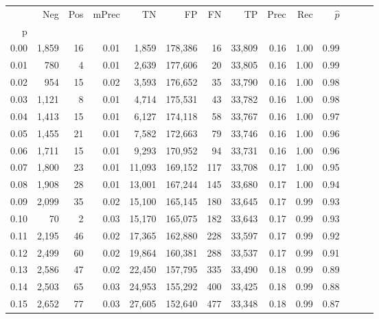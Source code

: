 \begin{tabular}{rrrrrrrrrrrrrr}
\toprule
{} &    Neg &  Pos & mPrec &       TN &       FP &      FN &      TP &  Prec &   Rec & $\hat{p}$ \\
p    &        &      &       &          &          &         &         &       &       &           \\
\midrule
0.00 &  1,859 &   16 &  0.01 &    1,859 &  178,386 &      16 &  33,809 &  0.16 &  1.00 &      0.99 \\
0.01 &    780 &    4 &  0.01 &    2,639 &  177,606 &      20 &  33,805 &  0.16 &  1.00 &      0.99 \\
0.02 &    954 &   15 &  0.02 &    3,593 &  176,652 &      35 &  33,790 &  0.16 &  1.00 &      0.98 \\
0.03 &  1,121 &    8 &  0.01 &    4,714 &  175,531 &      43 &  33,782 &  0.16 &  1.00 &      0.98 \\
0.04 &  1,413 &   15 &  0.01 &    6,127 &  174,118 &      58 &  33,767 &  0.16 &  1.00 &      0.97 \\
0.05 &  1,455 &   21 &  0.01 &    7,582 &  172,663 &      79 &  33,746 &  0.16 &  1.00 &      0.96 \\
0.06 &  1,711 &   15 &  0.01 &    9,293 &  170,952 &      94 &  33,731 &  0.16 &  1.00 &      0.96 \\
0.07 &  1,800 &   23 &  0.01 &   11,093 &  169,152 &     117 &  33,708 &  0.17 &  1.00 &      0.95 \\
0.08 &  1,908 &   28 &  0.01 &   13,001 &  167,244 &     145 &  33,680 &  0.17 &  1.00 &      0.94 \\
0.09 &  2,099 &   35 &  0.02 &   15,100 &  165,145 &     180 &  33,645 &  0.17 &  0.99 &      0.93 \\
0.10 &     70 &    2 &  0.03 &   15,170 &  165,075 &     182 &  33,643 &  0.17 &  0.99 &      0.93 \\
0.11 &  2,195 &   46 &  0.02 &   17,365 &  162,880 &     228 &  33,597 &  0.17 &  0.99 &      0.92 \\
0.12 &  2,499 &   60 &  0.02 &   19,864 &  160,381 &     288 &  33,537 &  0.17 &  0.99 &      0.91 \\
0.13 &  2,586 &   47 &  0.02 &   22,450 &  157,795 &     335 &  33,490 &  0.18 &  0.99 &      0.89 \\
0.14 &  2,503 &   65 &  0.03 &   24,953 &  155,292 &     400 &  33,425 &  0.18 &  0.99 &      0.88 \\
0.15 &  2,652 &   77 &  0.03 &   27,605 &  152,640 &     477 &  33,348 &  0.18 &  0.99 &      0.87 \\

\end{tabular}
